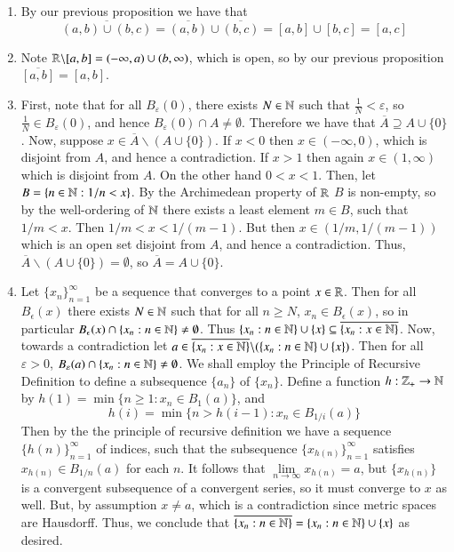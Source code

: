 \documentclass[12pt, a4paper, twoside, openright, titlepage]{book}
\begin{document}
\begin{eg}{}{}
\begin{enumerate}
\begin{proof*}{}{}
\begin{enumerate}
                    \item By our previous proposition we have that $$\overline{(a,b)\cup(b,c)} = \overline{(a,b)}\cup\overline{(b,c)} = [a,b]\cup[b,c] = [a,c]$$
                    \item Note $\mathbb R\backslash[a,b] = (-\infty,a)\cup(b,\infty)$, which is open, so by our previous proposition $\overline{[a,b]} = [a,b]$.
                    \item First, note that for all $B_{\varepsilon}(0)$, there exists $N \in \mathbb N$ such that $\frac{1}{N} < \varepsilon$, so $\frac{1}{N} \in B_{\varepsilon}(0)$, and hence $B_{\varepsilon}(0) \cap A \neq \emptyset.$ Therefore we have that $\overline{A} \supseteq A \cup \{0\}$. Now, suppose $x \in \overline{A}\backslash (A\cup\{0\})$. If $x < 0$ then $x \in (-\infty, 0)$, which is disjoint from $A$, and hence a contradiction. If $x > 1$ then again $x \in (1,\infty)$ which is disjoint from $A$. On the other hand $0 < x < 1$. Then, let $B = \{n \in \mathbb N: 1/n < x\}$. By the Archimedean property of $\mathbb R$ $B$ is non-empty, so by the well-ordering of $\mathbb N$ there exists a least element $m \in B$, such that $1/m < x$. Then $1/m < x < 1/(m-1)$. But then $x \in (1/m,1/(m-1))$ which is an open set disjoint from $A$, and hence a contradiction. Thus, $\overline{A}\backslash (A\cup\{0\}) = \emptyset$, so $\overline{A} = A\cup\{0\}$.
                    \item Let $\{x_n\}_{n=1}^{\infty}$ be a sequence that converges to a point $x \in \mathbb R$. Then for all $B_{\epsilon}(x)$ there exists $N \in \mathbb N$ such that for all $n \geq N$, $x_n \in B_{\epsilon}(x)$, so in particular $B_{\epsilon}(x) \cap \{x_n:n\in\mathbb N\} \neq \emptyset$. Thus $\{x_n:n\in\mathbb N\}\cup\{x\} \subseteq \overline{\{x_n:x\in\mathbb N\}}$. Now, towards a contradiction let $a \in \overline{\{x_n:x\in\mathbb N\}}\backslash (\{x_n:n\in\mathbb N\}\cup\{x\})$. Then for all $\varepsilon > 0$, $B_{\varepsilon}(a)\cap\{x_n:n\in\mathbb N\} \neq \emptyset$. We shall employ the Principle of Recursive Definition to define a subsequence $\{a_n\}$ of $\{x_n\}$. Define a function $h:\mathbb Z_+\rightarrow \mathbb N$ by $h(1) = \min\{n \geq 1: x_n \in B_1(a)\}$, and \begin{equation*}
                            h(i) = \min\{n>h(i-1):x_n \in B_{1/i}(a)\}
                    \end{equation*}
                        Then by the the principle of recursive definition we have a sequence $\{h(n)\}_{n=1}^{\infty}$ of indices, such that the subsequence $\{x_{h(n)}\}_{n=1}^{\infty}$ satisfies $x_{h(n)} \in B_{1/n}(a)$ for each $n$. It follows that $\lim\limits_{n\rightarrow \infty}x_{h(n)} = a$, but $\{x_{h(n)}\}$ is a convergent subsequence of a convergent series, so it must converge to $x$ as well. But, by assumption $x \neq a$, which is a contradiction since metric spaces are Hausdorff. Thus, we conclude that $\overline{\{x_n:n\in\mathbb N\}} = \{x_n:n\in\mathbb N\}\cup\{x\}$ as desired.

\end{enumerate}
\end{proof*}
\end{enumerate}
\end{eg}
\end{document}
